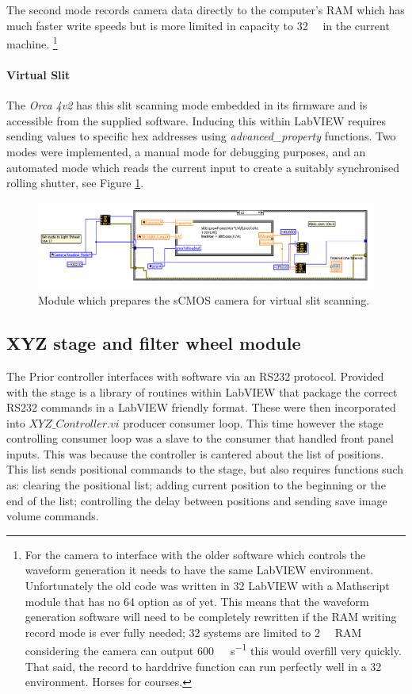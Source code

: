 The second mode records camera data directly to the computer's RAM which has much faster write speeds but is more limited in capacity to \SI{32}{\giga\byte}
in the current machine.
\footnote{For the camera to interface with the older software which controls the waveform generation it needs to have the same LabVIEW environment.
Unfortunately the old code was written in \SI{32}{\bit}
LabVIEW with a Mathscript module that has no \SI{64}{\bit}
 option as of yet.
This means that the waveform generation software will need to be completely rewritten if the RAM writing record mode is ever fully needed; \SI{32}{\bit}
systems are limited to \SI{2}{\giga\byte}
RAM considering the camera can output \SI{600}{\mega\byte\per\second}
this would overfill very quickly.
That said, the record to harddrive function can run perfectly well in a \SI{32}{\bit}
environment.
Horses for courses.}


\paragraph{Virtual Slit}

The \textit{Orca 4v2} has this slit scanning mode embedded in its firmware and is accessible from the supplied software.
Inducing this within LabVIEW requires sending values to specific hex addresses using \textit{advanced\_property} functions.
Two modes were implemented, a manual mode for debugging purposes, and an automated mode which reads the current input to create a suitably synchronised rolling shutter, see Figure \ref{fig:camera_virtual_slit_module}.

\begin{figure}
\centering
\includegraphics[width=0.7\linewidth]{Figures/camera_virtual_slit_module}
\caption[LabVIEW virtual slit scanning module]{Module which prepares the sCMOS camera for virtual slit scanning.}
\label{fig:camera_virtual_slit_module}
\end{figure}

\subsection{XYZ stage and filter wheel module}

The Prior controller interfaces with software via an RS232 protocol.
Provided with the stage is a library of routines within LabVIEW that package the correct RS232 commands in a LabVIEW friendly format.
These were then incorporated into $XYZ\_Controller.vi$ producer consumer loop.
This time however the stage controlling consumer loop was a slave to the consumer that handled front panel inputs.
This was because the controller is cantered about the list of positions.
This list sends positional commands to the stage, but also requires functions such as: clearing the positional list; adding current position to the beginning or the end of the list; controlling the delay between positions and sending save image volume commands.

